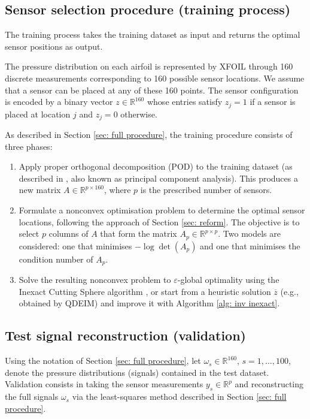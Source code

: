 \documentclass[12pt]{amsart}
\theoremstyle{plain}
\theoremstyle{definition}
\begin{document}
\subsection{Sensor selection procedure (training process)}
\label{sec:train}

The training process takes the training dataset as input and returns the optimal sensor positions as output.

The pressure distribution on each airfoil is represented by XFOIL through 160 discrete measurements corresponding to 160 possible sensor locations. We assume that a sensor can be placed at any of these 160 points. The sensor configuration is encoded by a binary vector \(z \in \mathbb{R}^{160}\) whose entries satisfy \(z_j = 1\) if a sensor is placed at location \(j\) and \(z_j = 0\) otherwise.

As described in Section \ref{sec: full procedure}, the training procedure consists of three phases:
\begin{enumerate}
    \item Apply proper orthogonal decomposition (POD) to the training dataset (as described in \cite{manohar2017data}, also known as principal component analysis). This produces a new matrix \(A \in \mathbb{R}^{p \times 160}\), where \(p\) is the prescribed number of sensors.
    
    \item Formulate a nonconvex optimisation problem to determine the optimal sensor locations, following the approach of Section \ref{sec: reform}. The objective is to select \(p\) columns of \(A\) that form the matrix \(A_p \in \mathbb{R}^{p \times p}\). Two models are considered: one that minimises \(-\log\det(A_p)\) and one that minimises the condition number of \(A_p\).
    
    \item Solve the resulting nonconvex problem to \(\varepsilon\)-global optimality using the Inexact Cutting Sphere algorithm \cite[Algorithm 3]{bednarczuk2026outer}, or start from a heuristic solution \(\overline{z}\) (e.g., obtained by QDEIM) and improve it with Algorithm \ref{alg: inv inexact}.
\end{enumerate}

\subsection{Test signal reconstruction (validation)}

Using the notation of Section \ref{sec: full procedure}, let \(\omega_s \in \mathbb{R}^{160}\), \(s = 1, \dots, 100\), denote the pressure distributions (signals) contained in the test dataset. Validation consists in taking the sensor measurements \(y_s \in \mathbb{R}^p\) and reconstructing the full signals \(\omega_s\) via the least-squares method described in Section \ref{sec: full procedure}.
\end{document}
